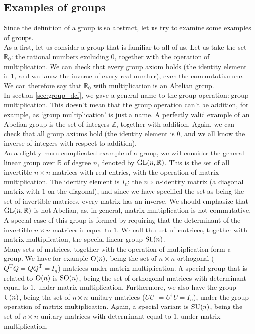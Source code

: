     \subsection{Examples of groups}
        Since the definition of a group is so abstract, let us try to examine some examples of groups. \\

        As a first, let us consider a group that is familiar to all of us. Let us take the set $\mathbb{R}_0$: the rational numbers excluding $0$, together with the operation of multiplication. We can check that every group axiom holds (the identity element is $1$, and we know the inverse of every real number), even the commutative one. We can therefore say that $\mathbb{R}_0$ with multiplication is an Abelian group. \\

        In section \ref{sec:group_def}, we gave a general name to the group operation: group multiplication. This doesn't mean that the group operation can't be addition, for example, as `group multiplication' is just a name. A perfectly valid example of an Abelian group is the set of integers $\mathbb{Z}$, together with addition. Again, we can check that all group axioms hold (the identity element is $0$, and we all know the inverse of integers with respect to addition). \\

        As a slightly more complicated example of a group, we will consider the general linear group over $\mathbb{R}$ of degree $n$, denoted by $\operatorname{GL}(n, \mathbb{R})$. This is the set of all invertible $n \times n$-matrices with real entries, with the operation of matrix multiplication. The identity element is $I_n$: the $n \times n$-identity matrix (a diagonal matrix with $1$ on the diagonal), and since we have specified the set as being the set of invertible matrices, every matrix has an inverse. We should emphasize that $\operatorname{GL}(n, \mathbb{R})$ is not Abelian, as, in general, matrix multiplication is not commutative. A special case of this group is formed by requiring that the determinant of the invertible $n \times n$-matrices is equal to $1$. We call this set of matrices, together with matrix multiplication, the special linear group $\operatorname{SL}(n)$. \\

        Many sets of matrices, together with the operation of multiplication form a group. We have for example $\operatorname{O}(n)$, being the set of $n \times n$ orthogonal ($Q^\text{T} Q = Q Q^\text{T} = I_n$) matrices under matrix multiplication. A special group that is related to $\operatorname{O}(n)$ is $\operatorname{SO}(n)$, being the set of orthogonal matrices with determinant equal to $1$, under matrix multiplication. Furthermore, we also have the group $\operatorname{U}(n)$, being the set of $n \times n$ unitary matrices ($U U^\dagger = U^\dagger U = I_n$), under the group operation of matrix multiplication. Again, a special variant is $\operatorname{SU}(n)$, being the set of $n \times n$ unitary matrices with determinant equal to $1$, under matrix multiplication. \\

